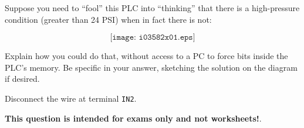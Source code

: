

Suppose you need to ``fool'' this PLC into ``thinking'' that there is a high-pressure condition (greater than 24 PSI) when in fact there is not:

$$\texttt{[image: i03582x01.eps]}$$

Explain how you could do that, without access to a PC to force bits inside the PLC's memory.  Be specific in your answer, sketching the solution on the diagram if desired.







Disconnect the wire at terminal {\tt IN2}.







{\bf This question is intended for exams only and not worksheets!}.


